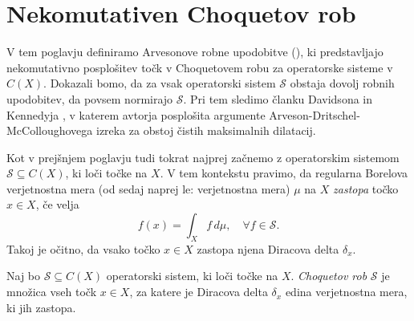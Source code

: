 
\section{Nekomutativen Choquetov rob}\label{sec:12}

V tem poglavju definiramo Arvesonove robne upodobitve (\cite{arveson1969}), ki predstavljajo nekomutativno posplošitev točk v Choquetovem robu za operatorske sisteme v $C(X)$.
Dokazali bomo, da za vsak operatorski sistem $\mathcal{S}$ obstaja dovolj robnih upodobitev, da {povsem normirajo} $\mathcal{S}$.
Pri tem sledimo članku Davidsona in Kennedyja \cite{davidson2015},
v katerem avtorja posplošita argumente Arveson-Dritschel-McColloughovega izreka za obstoj čistih maksimalnih dilatacij.

Kot v prejšnjem poglavju tudi tokrat najprej začnemo z operatorskim sistemom $\mathcal{S} \subseteq C(X)$,
ki loči točke na $X$.
V tem kontekstu pravimo, da regularna Borelova verjetnostna mera (od sedaj naprej le: verjetnostna mera) $\mu$ na $X$ \emph{zastopa} točko $x \in X$,
če velja $$f(x) = \int_X f\, d\mu,\quad \forall f \in \mathcal{S}.$$
Takoj je očitno, da vsako točko $x \in X$ zastopa njena Diracova delta $\delta_x$.

\begin{definicija}
    Naj bo $\mathcal{S} \subseteq C(X)$ operatorski sistem, ki loči točke na $X$.
    \emph{Choquetov rob} $\mathcal{S}$ je množica vseh točk $x \in X$,
    za katere je Diracova delta $\delta_x$ edina verjetnostna mera, ki jih zastopa.
\end{definicija}



